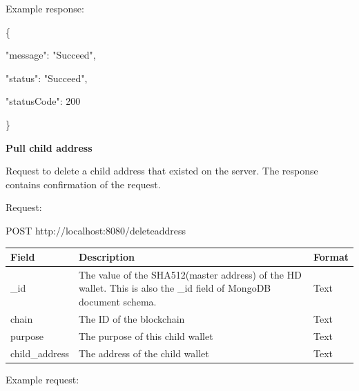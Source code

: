 Example response:

\begin{framed}
    \hspace*{13mm}        \{ \par
    \hspace*{13mm}                "message": "Succeed",    \par
    \hspace*{13mm}                "status": "Succeed",    \par
    \hspace*{13mm}             "statusCode": 200    \par
    \hspace*{13mm}                 \}    \par
\end{framed}


\bigskip
{\textbf{Pull child address }}
\bigskip

Request to delete a child address that existed on the server. The response contains confirmation of the request.

Request:

\begin{framed}
    POST http://localhost:8080/deleteaddress
\end{framed}

\begin{tabular}{| m{3cm} | m{9cm} | m{2.6cm} |}
    \hline
    Field & Description & Format                                            \\ \hline
    \_id & The value of the SHA512(master address) of the HD wallet. This is also the \_id field of MongoDB document schema.  & Text   \\ \hline
    chain   & The ID of the blockchain & Text    \\ \hline
    purpose   & The purpose of this child wallet & Text    \\ \hline
    child\_address   & The address of the child wallet & Text    \\ \hline
\end{tabular}
\bigskip

Example request:

